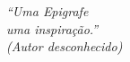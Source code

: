 \begin{epigrafe}
	\vspace*{\fill}
	\begin{flushright}
		\textit{``Uma Epigrafe\\
			uma inspiração.'' \\
			(Autor desconhecido)}
	\end{flushright}
\end{epigrafe}
